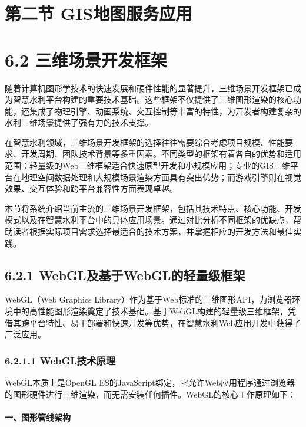 \section{第二节
GIS地图服务应用}\label{ux7b2cux4e8cux8282-gisux5730ux56feux670dux52a1ux5e94ux7528}

\section{6.2
三维场景开发框架}\label{ux4e09ux7ef4ux573aux666fux5f00ux53d1ux6846ux67b6}

随着计算机图形学技术的快速发展和硬件性能的显著提升，三维场景开发框架已成为智慧水利平台构建的重要技术基础。这些框架不仅提供了三维图形渲染的核心功能，还集成了物理引擎、动画系统、交互控制等丰富的特性，为开发者构建复杂的水利三维场景提供了强有力的技术支撑。

在智慧水利领域，三维场景开发框架的选择往往需要综合考虑项目规模、性能要求、开发周期、团队技术背景等多重因素。不同类型的框架有着各自的优势和适用范围：轻量级的Web三维框架适合快速原型开发和小规模应用；专业的GIS三维平台在地理空间数据处理和大规模场景渲染方面具有突出优势；而游戏引擎则在视觉效果、交互体验和跨平台兼容性方面表现卓越。

本节将系统介绍当前主流的三维场景开发框架，包括其技术特点、核心功能、开发模式以及在智慧水利平台中的具体应用场景。通过对比分析不同框架的优缺点，帮助读者根据实际项目需求选择最适合的技术方案，并掌握相应的开发方法和最佳实践。

\subsection{6.2.1
WebGL及基于WebGL的轻量级框架}\label{webglux53caux57faux4e8ewebglux7684ux8f7bux91cfux7ea7ux6846ux67b6}

WebGL（Web Graphics
Library）作为基于Web标准的三维图形API，为浏览器环境中的高性能图形渲染奠定了技术基础。基于WebGL构建的轻量级三维框架，凭借其跨平台特性、易于部署和快速开发等优势，在智慧水利Web应用开发中获得了广泛应用。

\subsubsection{6.2.1.1
WebGL技术原理}\label{webglux6280ux672fux539fux7406}

WebGL本质上是OpenGL
ES的JavaScript绑定，它允许Web应用程序通过浏览器的图形硬件进行三维渲染，而无需安装任何插件。WebGL的核心工作原理如下：

\paragraph{一、图形管线架构}\label{ux4e00ux56feux5f62ux7ba1ux7ebfux67b6ux6784}

